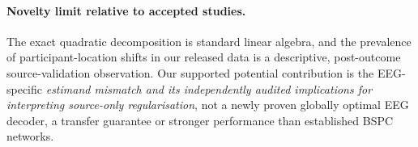 \paragraph{Novelty limit relative to accepted studies.}
The exact quadratic decomposition is
standard linear algebra, and the
prevalence of participant-location shifts
in our released data is a descriptive,
post-outcome source-validation observation.
Our supported potential contribution is
the EEG-specific \emph{estimand mismatch and
its independently audited implications
for interpreting source-only regularisation},
not a newly proven globally optimal
EEG decoder, a transfer guarantee or
stronger performance than established
BSPC networks.

